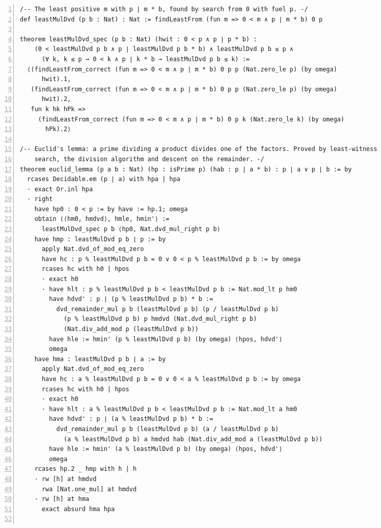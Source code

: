 \documentclass[10pt]{article}
\newcommand{\leansize}{\fontsize{5.5pt}{6.75pt}\selectfont}
\begin{document}
\begin{multicols}{2}
\begin{Verbatim}[numbers=left,firstnumber=1,numbersep=3pt,xleftmargin=2.6em,breaklines=true,breakanywhere=true,breakautoindent=false,breakindent=1.4em,breaksymbolleft={},breakanywheresymbolpre={},fontsize=\leansize]
/-- The least positive m with p ∣ m * b, found by search from 0 with fuel p. -/
def leastMulDvd (p b : Nat) : Nat := findLeastFrom (fun m => 0 < m ∧ p ∣ m * b) 0 p

theorem leastMulDvd_spec (p b : Nat) (hwit : 0 < p ∧ p ∣ p * b) :
    (0 < leastMulDvd p b ∧ p ∣ leastMulDvd p b * b) ∧ leastMulDvd p b ≤ p ∧
      (∀ k, k ≤ p → 0 < k ∧ p ∣ k * b → leastMulDvd p b ≤ k) :=
  ⟨(findLeastFrom_correct (fun m => 0 < m ∧ p ∣ m * b) 0 p p (Nat.zero_le p) (by omega)
      hwit).1,
   (findLeastFrom_correct (fun m => 0 < m ∧ p ∣ m * b) 0 p p (Nat.zero_le p) (by omega)
      hwit).2,
   fun k hk hPk =>
     (findLeastFrom_correct (fun m => 0 < m ∧ p ∣ m * b) 0 p k (Nat.zero_le k) (by omega)
       hPk).2⟩

/-- Euclid's lemma: a prime dividing a product divides one of the factors. Proved by least-witness
    search, the division algorithm and descent on the remainder. -/
theorem euclid_lemma (p a b : Nat) (hp : isPrime p) (hab : p ∣ a * b) : p ∣ a ∨ p ∣ b := by
  rcases Decidable.em (p ∣ a) with hpa | hpa
  · exact Or.inl hpa
  · right
    have hp0 : 0 < p := by have := hp.1; omega
    obtain ⟨⟨hm0, hmdvd⟩, hmle, hmin'⟩ :=
      leastMulDvd_spec p b ⟨hp0, Nat.dvd_mul_right p b⟩
    have hmp : leastMulDvd p b ∣ p := by
      apply Nat.dvd_of_mod_eq_zero
      have hc : p % leastMulDvd p b = 0 ∨ 0 < p % leastMulDvd p b := by omega
      rcases hc with h0 | hpos
      · exact h0
      · have hlt : p % leastMulDvd p b < leastMulDvd p b := Nat.mod_lt p hm0
        have hdvd' : p ∣ (p % leastMulDvd p b) * b :=
          dvd_remainder_mul p b (leastMulDvd p b) (p / leastMulDvd p b)
            (p % leastMulDvd p b) p hmdvd (Nat.dvd_mul_right p b)
            (Nat.div_add_mod p (leastMulDvd p b))
        have hle := hmin' (p % leastMulDvd p b) (by omega) ⟨hpos, hdvd'⟩
        omega
    have hma : leastMulDvd p b ∣ a := by
      apply Nat.dvd_of_mod_eq_zero
      have hc : a % leastMulDvd p b = 0 ∨ 0 < a % leastMulDvd p b := by omega
      rcases hc with h0 | hpos
      · exact h0
      · have hlt : a % leastMulDvd p b < leastMulDvd p b := Nat.mod_lt a hm0
        have hdvd' : p ∣ (a % leastMulDvd p b) * b :=
          dvd_remainder_mul p b (leastMulDvd p b) (a / leastMulDvd p b)
            (a % leastMulDvd p b) a hmdvd hab (Nat.div_add_mod a (leastMulDvd p b))
        have hle := hmin' (a % leastMulDvd p b) (by omega) ⟨hpos, hdvd'⟩
        omega
    rcases hp.2 _ hmp with h | h
    · rw [h] at hmdvd
      rwa [Nat.one_mul] at hmdvd
    · rw [h] at hma
      exact absurd hma hpa


\end{Verbatim}
\end{multicols}
\end{document}
